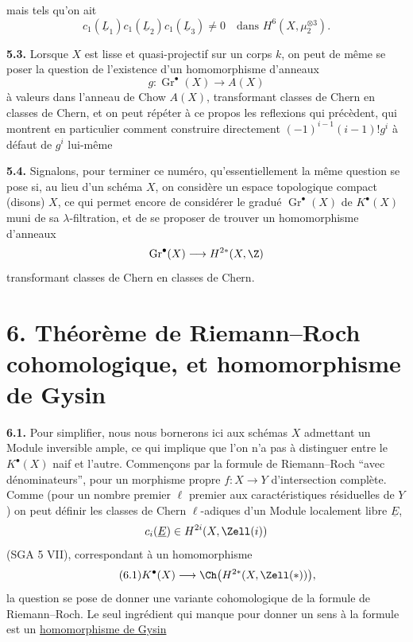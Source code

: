 
mais tels qu'on ait
\[
 c_1(\underline{L}_1)c_1(\underline{L}_2)c_1(\underline{L}_3)\ne0
 \quad\text{dans }H^6(X,\mu_2^{\otimes3}).
\]

\textbf{5.3.} Lorsque $X$ est lisse et quasi-projectif sur un corps $k$, on peut de même se poser la question de l'existence d'un homomorphisme d'anneaux
\[
 g:\operatorname{Gr}^\bullet(X)\longrightarrow A(X)
\]
à valeurs dans l'anneau de Chow $A(X)$, transformant classes de Chern en classes de Chern, et on peut répéter à ce propos les reflexions qui précèdent, qui montrent en particulier comment construire directement $(-1)^{i-1}(i-1)!g^i$ à défaut de $g^i$ lui-même

\textbf{5.4.} Signalons, pour terminer ce numéro, qu'essentiellement la même question se pose si, au lieu d'un schéma $X$, on considère un espace topologique compact (disons) $X$, ce qui permet encore de considérer le gradué $\operatorname{Gr}^\bullet(X)$ de $K^\bullet(X)$ muni de sa $\lambda$-filtration, et de se proposer de trouver un homomorphisme d'anneaux
\[
 \operatorname{Gr}^\bullet(X)\longrightarrow H^{2*}(X,\Z)
\]
transformant classes de Chern en classes de Chern.

\section*{6. Théorème de Riemann--Roch cohomologique, et homomorphisme de Gysin}

\textbf{6.1.} Pour simplifier, nous nous bornerons ici aux schémas $X$ admettant un Module inversible ample, ce qui implique que l'on n'a pas à distinguer entre le $K^\bullet(X)$ naif et l'autre. Commençons par la formule de Riemann--Roch ``avec dénominateurs'', pour un morphisme propre $f:X\to Y$ d'intersection complète. Comme (pour un nombre premier $\ell$ premier aux caractéristiques résiduelles de $Y$) on peut définir les classes de Chern $\ell$-adiques d'un Module localement libre $\underline{E}$,
\[
 c_i(\underline{E})\in H^{2i}(X,\Zell(i))
\]
(SGA 5 VII), correspondant à un homomorphisme
\begin{equation}\tag{6.1}
 K^\bullet(X)\longrightarrow \Ch\bigl(H^{2*}(X,\Zell(*))\bigr),
\end{equation}
la question se pose de donner une variante cohomologique de la formule de Riemann--Roch. Le seul ingrédient qui manque pour donner un sens à la formule est un \uline{homomorphisme de Gysin}

